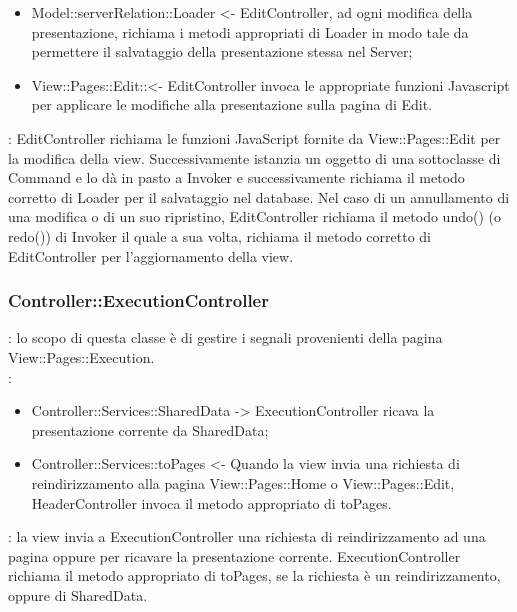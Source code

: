 {{\begin{itemize}
			\item Model::\-serverRelation::\-Loader <- EditController, ad ogni modifica della presentazione, richiama i metodi appropriati di Loader in modo tale da permettere il salvataggio della presentazione stessa nel Server;

			\item View::\-Pages::\-Edit:: <- EditController invoca le appropriate funzioni Javascript per applicare le modifiche alla presentazione sulla pagina di Edit.
		\end{itemize} 
		\textbf{\interfacce}: EditController richiama le funzioni JavaScript fornite da View::\-Pages::\-Edit per la modifica della view. Successivamente istanzia un oggetto di una sottoclasse di Command e lo dà in pasto a Invoker e successivamente richiama il metodo corretto di Loader per il salvataggio nel database. Nel caso di un annullamento di una modifica o di un suo ripristino, EditController richiama il metodo undo() (o redo()) di Invoker il quale a sua volta, richiama il metodo corretto di EditController per l'aggiornamento della view.
	}
		
	\subsubsection{Controller::\-ExecutionController}{
		\textbf{\tipo}: lo scopo di questa classe è di gestire i segnali provenienti della pagina View::\-Pages::\-Execution.\\	
		\textbf{\relaz}:
		\begin{itemize}
			\item Controller::\-Services::\-SharedData -> ExecutionController ricava la presentazione corrente da SharedData;
			\item Controller::\-Services::\-toPages <- Quando la view invia una richiesta di reindirizzamento alla pagina View::\-Pages::\-Home o View::\-Pages::\-Edit, HeaderController invoca il metodo appropriato di toPages.
		\end{itemize}
		\textbf{\interfacce}: la view invia a ExecutionController una richiesta di reindirizzamento ad una pagina oppure per ricavare la presentazione corrente. ExecutionController richiama il metodo appropriato di toPages, se la richiesta è un reindirizzamento, oppure di SharedData.
	}
}
